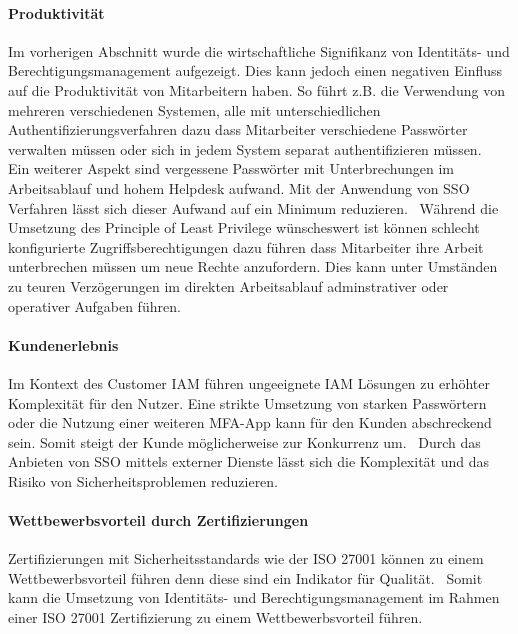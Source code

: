 \documentclass[12pt]{article}
\begin{document}
\paragraph{Produktivität}
Im vorherigen Abschnitt wurde die wirtschaftliche Signifikanz von Identitäts- und Berechtigungsmanagement aufgezeigt. Dies kann jedoch einen negativen Einfluss auf die Produktivität von Mitarbeitern haben. So führt z.B. die Verwendung von mehreren verschiedenen Systemen, alle mit unterschiedlichen Authentifizierungsverfahren dazu dass Mitarbeiter verschiedene Passwörter verwalten müssen oder sich in jedem System separat authentifizieren müssen.~\cite{radha2012survey}\cite{haag2012selecting} Ein weiterer Aspekt sind vergessene Passwörter mit Unterbrechungen im Arbeitsablauf und hohem Helpdesk aufwand. Mit der Anwendung von SSO Verfahren lässt sich dieser Aufwand auf ein Minimum reduzieren.~\cite{thakur2015user} Während die Umsetzung des Principle of Least Privilege wünscheswert ist können schlecht konfigurierte Zugriffsberechtigungen dazu führen dass Mitarbeiter ihre Arbeit unterbrechen müssen um neue Rechte anzufordern. Dies kann unter Umständen zu teuren Verzögerungen im direkten Arbeitsablauf adminstrativer oder operativer Aufgaben führen.~\cite{weishaupl2015towards}
\paragraph{Kundenerlebnis}
Im Kontext des Customer IAM führen ungeeignete IAM Lösungen zu erhöhter Komplexität für den Nutzer. Eine strikte Umsetzung von starken Passwörtern oder die Nutzung einer weiteren MFA-App kann für den Kunden abschreckend sein. Somit steigt der Kunde möglicherweise zur Konkurrenz um.~\cite{azhar2014economics} Durch das Anbieten von SSO mittels externer Dienste lässt sich die Komplexität und das Risiko von Sicherheitsproblemen reduzieren.
\paragraph{Wettbewerbsvorteil durch Zertifizierungen}
Zertifizierungen mit Sicherheitsstandards wie der ISO 27001 können zu einem Wettbewerbsvorteil führen denn diese sind ein Indikator für Qualität.~\cite{dobrin2015quality} Somit kann die Umsetzung von Identitäts- und Berechtigungsmanagement im Rahmen einer ISO 27001 Zertifizierung zu einem Wettbewerbsvorteil führen.
\end{document}
